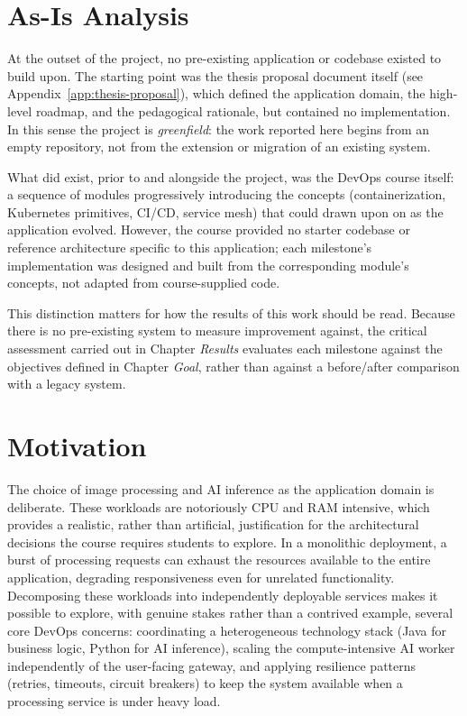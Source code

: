 \documentclass[twoside]{supsistudent}
\begin{document}
\section{As-Is Analysis}
At the outset of the project, no pre-existing application or codebase existed to build upon. The starting point was the thesis proposal document itself (see Appendix~\ref{app:thesis-proposal}), which defined the application domain, the high-level roadmap, and the pedagogical rationale, but contained no implementation. In this sense the project is \emph{greenfield}: the work reported here begins from an empty repository, not from the extension or migration of an existing system.

What did exist, prior to and alongside the project, was the DevOps course itself: a sequence of modules progressively introducing the concepts (containerization, Kubernetes primitives, CI/CD, service mesh) that could drawn upon on as the application evolved. However, the course provided no starter codebase or reference architecture specific to this application; each milestone's implementation was designed and built from the corresponding module's concepts, not adapted from course-supplied code.

This distinction matters for how the results of this work should be read. Because there is no pre-existing system to measure improvement against, the critical assessment carried out in Chapter \emph{Results} evaluates each milestone against the objectives defined in Chapter \emph{Goal}, rather than against a before/after comparison with a legacy system.

\section{Motivation}
The choice of image processing and AI inference as the application domain is deliberate. These workloads are notoriously CPU and RAM intensive, which provides a realistic, rather than artificial, justification for the architectural decisions the course requires students to explore. In a monolithic deployment, a burst of processing requests can exhaust the resources available to the entire application, degrading responsiveness even for unrelated functionality. Decomposing these workloads into independently deployable services makes it possible to explore, with genuine stakes rather than a contrived example, several core DevOps concerns: coordinating a heterogeneous technology stack (Java for business logic, Python for AI inference), scaling the compute-intensive AI worker independently of the user-facing gateway, and applying resilience patterns (retries, timeouts, circuit breakers) to keep the system available when a processing service is under heavy load.
\end{document}
